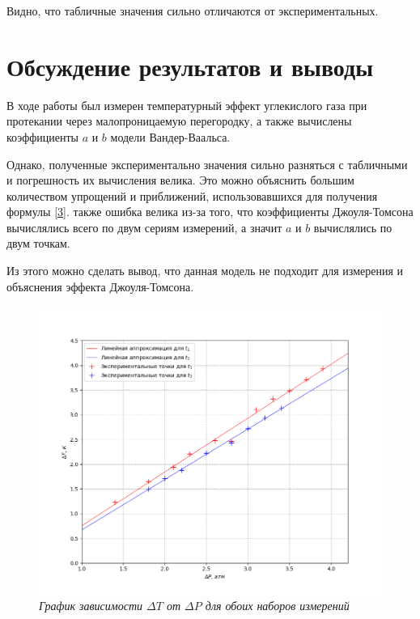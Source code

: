 \documentclass[a4paper,12pt]{article}
\begin{document}
Видно, что табличные значения сильно отличаются от экспериментальных.

\section{Обсуждение результатов и выводы}

В ходе работы был измерен температурный эффект углекислого газа при протекании через малопроницаемую перегородку, а также вычислены коэффициенты $a$ и $b$ модели Вандер-Ваальса.

Однако, полученные экспериментально значения сильно разняться с табличными и погрешность их вычисления велика. Это можно объяснить большим количеством упрощений и приближений, использовавшихся для получения формулы \eqref{3}. также ошибка велика из-за того, что коэффициенты Джоуля-Томсона вычислялись всего по двум сериям измерений, а значит $a$ и $b$ вычислялись по двум точкам.

Из этого можно сделать вывод, что данная модель не подходит для измерения и объяснения эффекта Джоуля-Томсона.

\newpage


\begin{figure}[h!]
        \centering
	\includegraphics[width=1.1\textwidth]{graph.png}
	\caption{\textit{График зависимости $\Delta T$ от $\Delta P$ для обоих наборов измерений}}
	\label{graph}
\end{figure}
\end{document}
